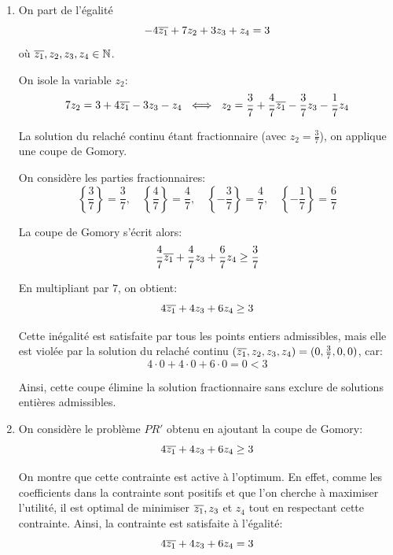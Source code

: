 {\begin{td-sol}[]
\begin{enumerate}
			\item On part de l'égalité
			\begin{equation*}
			-4 \overline{z_1} + 7 z_2 + 3 z_3 + z_4 = 3
			\end{equation*}
			où \(\overline{z_1}, z_2, z_3, z_4 \in \mathbb{N}\).

			On isole la variable \(z_2\):
			\begin{equation*}
				7 z_2 = 3 + 4\ol{z_1} - 3 z_3 - z_4
				\ \iff\ 
				z_2 = \frac{3}{7} + \frac{4}{7}\ol{z_1} - \frac{3}{7}z_3 - \frac{1}{7}z_4
			\end{equation*}

			La solution du relaché continu étant fractionnaire (avec \(z_2 = \frac{3}{7}\)), on applique une coupe de Gomory.

			On considère les parties fractionnaires:
			\begin{equation*}
				\left\{\frac{3}{7}\right\} = \frac{3}{7}, \quad
				\left\{\frac{4}{7}\right\} = \frac{4}{7}, \quad
				\left\{-\frac{3}{7}\right\} = \frac{4}{7}, \quad
				\left\{-\frac{1}{7}\right\} = \frac{6}{7}
			\end{equation*}

			La coupe de Gomory s'écrit alors:
			\begin{equation*}
				\frac{4}{7}\overline{z_1} + \frac{4}{7} z_3 + \frac{6}{7} z_4 \geq \frac{3}{7}
			\end{equation*}

			En multipliant par \(7\), on obtient:
			\begin{equation*}
				4\overline{z_1} + 4 z_3 + 6 z_4 \geq 3
			\end{equation*}

			Cette inégalité est satisfaite par tous les points entiers admissibles, mais elle est violée par la solution du relaché continu \((\overline{z_1}, z_2, z_3, z_4) = (0, \frac{3}{7}, 0, 0)\), car:
			\begin{equation*}
				4 \cdot 0 + 4 \cdot 0 + 6 \cdot 0 = 0 < 3
			\end{equation*}

			Ainsi, cette coupe élimine la solution fractionnaire sans exclure de solutions entières admissibles.

			\item On considère le problème \(PR'\) obtenu en ajoutant la coupe de Gomory:
			\begin{equation*}
				4\overline{z_1} + 4 z_3 + 6 z_4 \geq 3
			\end{equation*}

			On montre que cette contrainte est active à l'optimum. 
			En effet, comme les coefficients dans la contrainte sont positifs et que l'on cherche à maximiser l'utilité, il est optimal de minimiser \(\overline{z_1}, z_3\) et \(z_4\) tout en respectant cette contrainte. 
			Ainsi, la contrainte est satisfaite à l'égalité:
			\begin{equation*}
				4\overline{z_1} + 4 z_3 + 6 z_4 = 3
			\end{equation*}


\end{enumerate}
\end{td-sol}}
